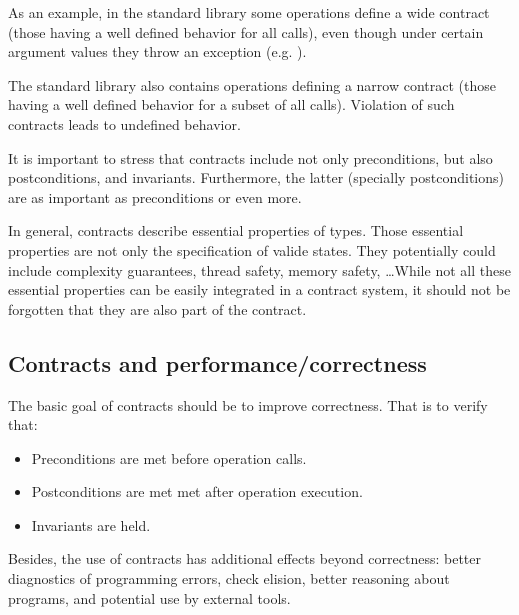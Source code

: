 As an example, in the standard library some operations define a wide contract
(those having a well defined behavior for all calls), even though under certain
argument values they throw an exception (e.g. ).

The standard library also contains operations defining a narrow contract (those
having a well defined behavior for a subset of all calls). Violation of such
contracts leads to undefined behavior.

It is important to stress that contracts include not only preconditions, but
also postconditions, and invariants. Furthermore, the latter (specially postconditions) 
are as important as preconditions or even more.

In general, contracts describe essential properties of types. Those essential
properties are not only the specification of valide states. They potentially could
include complexity guarantees, thread safety, memory safety, \ldots While not all
these essential properties can be easily integrated in a contract system, it should
not be forgotten that they are also part of the contract.


\subsection{Contracts and performance/correctness}

The basic goal of contracts should be to improve correctness. That is to verify
that:

\begin{itemize}
\item Preconditions are met before operation calls.
\item Postconditions are met met after operation execution.
\item Invariants are held.
\end{itemize}

Besides, the use of contracts has additional effects beyond correctness: better
diagnostics of programming errors, check elision, better reasoning about
programs, and potential use by external tools.



